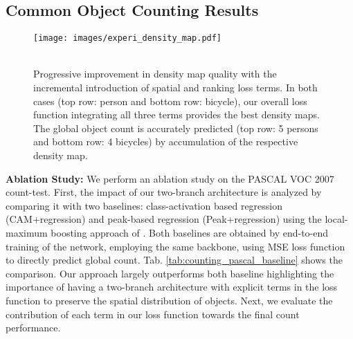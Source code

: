 \documentclass[10pt,twocolumn,letterpaper]{article}
\begin{document}
\subsection{Common Object Counting Results}
\begin{figure}[t]
		\centering
						\texttt{[image: images/experi\_density\_map.pdf]}\\ \vspace{-0.1cm}
						\\	\vspace*{-0.0cm}
			\caption{Progressive improvement in density map quality with the incremental introduction of spatial and ranking loss terms. In both cases (top row: person and bottom row: bicycle), our overall loss function integrating all three terms provides the best density maps. The global object count is accurately predicted (top row: 5 persons and bottom row: 4 bicycles) by accumulation of the respective density map.   
}
			\label{Fig:experi_densitymap}
			\vspace*{-0.2cm}
\end{figure}
\vspace{-0.1cm}
\label{expe:everyday object counting results}
\noindent\textbf{Ablation Study:}
We perform an ablation study on the PASCAL VOC 2007 count-test. First, the impact of our two-branch architecture is analyzed by comparing it with two baselines: class-activation \cite{CAM} based regression (CAM+regression) and peak-based regression (Peak+regression) using the local-maximum boosting approach of \cite{PRM}. Both baselines are obtained by end-to-end training of the network, employing the same backbone, using MSE loss function to directly predict global count. Tab. \ref{tab:counting_pascal_baseline} shows the comparison. Our approach largely outperforms both baseline highlighting the importance of having a two-branch architecture with explicit terms in the loss function to preserve the spatial distribution of objects. Next, we evaluate the contribution of each term in our loss function towards the final count performance.
\end{document}

